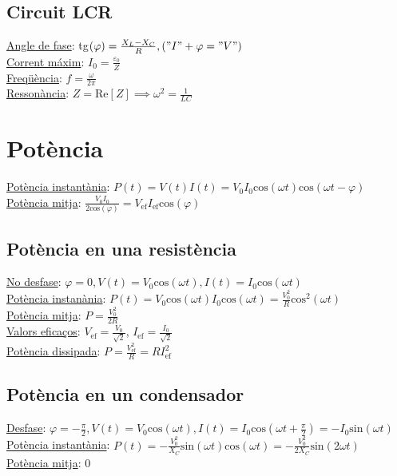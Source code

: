 \documentclass[12pt]{article}
\begin{document}
\begin{multicols}{5}
\subsection{Circuit LCR}

\underline{Angle de fase}: tg$(\varphi)=\frac{X_L-X_C}{R}, ("I" + \varphi = "V")$ \\
\underline{Corrent máxim}: $I_0 = \frac{\varepsilon_0}{Z}$ \\
\underline{Freqüència}: $f = \frac{\omega}{2\pi}$ \\
\underline{Ressonància}: $Z = \text{Re}[Z] \implies \omega^2 = \frac{1}{LC}$

\section{Potència}

\underline{Potència instantània}: $P(t) = V(t)I(t) = V_0I_0\text{cos}(\omega t)\text{cos}(\omega t - \varphi)$ \\
\underline{Potència mitja}: $\frac{V_0I_0}{2\text{cos}(\varphi)} = V_\text{ef}I_\text{ef}\text{cos}(\varphi)$

\subsection{Potència en una resistència}

\underline{No desfase}: $\varphi = 0, V(t) = V_0\text{cos}(\omega t), I(t) = I_0\text{cos}(\omega t)$ \\
\underline{Potència instanània}: $P(t) = V_0\text{cos}(\omega t)I_0\text{cos}(\omega t) = \frac{V_0^2}{R}\text{cos}^2(\omega t)$ \\
\underline{Potència mitja}: $P = \frac{V_0^2}{2R}$ \\
\underline{Valors eficaços}: $V_{\text{ef}} = \frac{V_0}{\sqrt{2}}$, $I_{\text{ef}} = \frac{I_0}{\sqrt{2}}$ \\
\underline{Potència dissipada}: $P = \frac{V_{\text{ef}}^2}{R} = RI_{\text{ef}}^2$

\subsection{Potència en un condensador}

\underline{Desfase}: $\varphi = -\frac{\pi}{2}, V(t) = V_0\text{cos}(\omega t), I(t) = I_0\text{cos}(\omega t + \frac{\pi}{2}) = -I_0\text{sin}(\omega t)$ \\
\underline{Potència instantània}: $P(t) = -\frac{V_0^2}{X_C}\text{sin}(\omega t)\text{cos}(\omega t) = -\frac{V_0^2}{2X_C}\text{sin}(2\omega t)$ \\
\underline{Potència mitja}: 0


\end{multicols}
\end{document}
